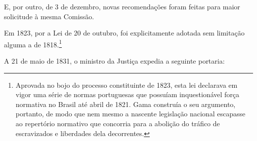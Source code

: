 E, por outro, de 3 de dezembro, novas recomendações foram feitas para
maior solicitude à mesma Comissão.

Em 1823, por a Lei de 20 de outubro, foi explicitamente adotada sem
limitação alguma a de 1818.\footnote{Aprovada no bojo do processo
  constituinte de 1823, esta lei declarava em vigor uma série de normas
  portuguesas que possuíam inquestionável força normativa no Brasil até
  abril de 1821. Gama construía o seu argumento, portanto, de modo que
  nem mesmo a nascente legislação nacional escapasse ao repertório
  normativo que concorria para a abolição do tráfico de escravizados e
  liberdades dela decorrentes.}

A 21 de maio de 1831, o ministro da Justiça expedia a seguinte portaria:

